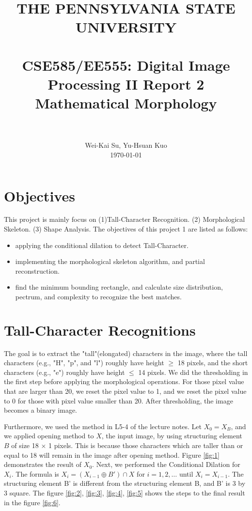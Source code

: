 \documentclass[paper=a4, fontsize=11pt]{scrartcl}
\title{
	\normalfont \normalsize \textsc{THE PENNSYLVANIA STATE UNIVERSITY} \\ [25pt]
	\horrule{1pt} \\[0.4cm]
	\huge {\bf CSE585/EE555: Digital Image Processing II Report 2 \\ Mathematical Morphology} \\
	\horrule{2pt} \\[0.5cm]
}
\author{
	\normalfont \normalsize
	 Wei-Kai Su, Yu-Hsuan Kuo\\[-3pt] \normalsize
  \today
}
\date{}
\begin{document}
\maketitle

\section{Objectives}
This project is mainly focus on (1)Tall-Character Recognition. (2) Morphological Skeleton. (3) Shape Analysis. The objectives of this project 1 are listed as follows: 

\begin{itemize}
	\item applying the conditional dilation to detect Tall-Character.
	\item implementing the morphological skeleton algorithm, and partial reconstruction.
	\item find the minimum bounding rectangle, and calculate size distribution, pectrum, and complexity to recognize the best matches.

\end{itemize}




\section{Tall-Character Recognitions}
The goal is to extract the "tall"(elongated) characters in the image, where the tall characters (e.g., "H", "p", and "l") roughly have height $\geq$ 18 pixels, and the short characters (e.g., "e") roughly have height $\leq$ 14 pixels. We did the thresholding in the first step before applying the morphological operations. For those pixel value that are larger than 20, we reset the pixel value to 1, and we reset the pixel value to 0 for those with pixel value smaller than 20.  After thresholding, the image becomes a binary image. 

Furthermore, we used the method in L5-4 of the lecture notes.  Let  $X_0 = X_B$, and we applied opening method to $X$, the input image, by using structuring element $B$ of size 18 $\times$ 1 pixels. This is because those characters which are taller than or equal to 18 will remain in the image after opening method.  Figure \ref{fig:1} demonstrates the result of $X_0$.
Next, we performed the Conditional Dilation for $X_i$. The formula is $X_i = (X_{i-1} \oplus B') \cap X$ for $i = 1,2, \dots $ until $X_i = X_{i-1}$. The structuring element B' is different from the structuring element B, and B' is 3 by 3 square. The figure \ref{fig:2}, \ref{fig:3}, \ref{fig:4}, \ref{fig:5} shows the steps to the final result in the figure \ref{fig:6}.
 
\end{document}
